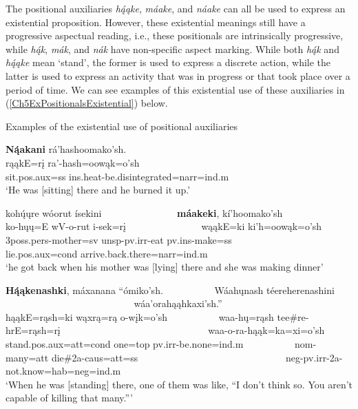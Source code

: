 The positional auxiliaries \textit{hą́ąke}, \textit{máake}, and \textit{náake} can all be used to express an existential proposition. However, these existential meanings still have a progressive aspectual reading, i.e., these positionals are intrinsically progressive, while \textit{hą́k}, \textit{mák}, and \textit{nák} have non-specific aspect marking. While both \textit{hą́k} and \textit{hą́ąke} mean `stand', the former is used to express a discrete action, while the latter is used to express an activity that was in progress or that took place over a period of time. We can see examples of this existential use of these auxiliaries in (\ref{Ch5ExPositionalsExistential}) below.

\begin{exe}
    \item\label{Ch5ExPositionalsExistential} Examples of the existential use of positional auxiliaries

    \begin{xlist}

    \item\label{Ch5ExPositionalsExistentialA} \glll \textbf{Ną́akani} rá'hashoomako'sh.\\
    rąąkE=rį ra'-hash=oowąk=o'sh\\
    \textnormal{sit}.pos.aux=ss ins.heat-\textnormal{be.disintegrated}=narr=ind.m\\
    \glt `He was [sitting] there and he burned it up.' \citep[182]{hollow1973b}

    \item\label{Ch5ExPositionalsExistentialB} \glll kohų́ųre wóorut ísekini ~ ~ ~ ~ ~ ~ ~ ~ ~ \textbf{máakeki}, kí'hoomako'sh\\
    ko-hųų=E wV-o-rut i-sek=rį ~ ~ ~ ~ ~ ~ ~ ~ ~ wąąkE=ki ki'h=oowąk=o'sh\\
    3poss.pers-\textnormal{mother}=sv unsp-pv.irr-\textnormal{eat} pv.ins-\textnormal{make}=ss ~ ~ ~ ~ ~ ~ ~ ~ ~ \textnormal{lie}.pos.aux=cond \textnormal{arrive.back.there}=narr=ind.m\\
    \glt `he got back when his mother was [lying] there and she was making dinner' \citep[67]{hollow1973a}

    \item\label{Ch5ExPositionalsExistentialC} \glll \textbf{Hą́ąkenashki}, máxanana ``ómiko'sh. ~ ~ ~ ~ ~ ~ Wáahųnash téereherenashini ~ ~ ~ ~ ~ ~ ~ ~ ~ ~ ~ ~ ~ ~ ~ ~ ~ ~ wáa'orahąąhkaxi'sh.''\\
    hąąkE=rąsh=ki wąxrą=rą o-wįk=o'sh ~ ~ ~ ~ ~ ~ waa-hų=rąsh tee\#re-hrE=rąsh=rį ~ ~ ~ ~ ~ ~ ~ ~ ~ ~ ~ ~ ~ ~ ~ ~ ~ ~ waa-o-ra-hąąk=ka=xi=o'sh\\
    \textnormal{stand}.pos.aux=att=cond \textnormal{one}=top pv.irr-\textnormal{be.none}=ind.m ~ ~ ~ ~ ~ ~ nom-\textnormal{many}=att \textnormal{die}\#2a-caus=att=ss ~ ~ ~ ~ ~ ~ ~ ~ ~ ~ ~ ~ ~ ~ ~ ~ ~ ~ neg-pv.irr-2a-\textnormal{not.know}=hab=neg=ind.m\\
    \glt `When he was [standing] there, one of them was like, ``I don't think so. You aren't capable of killing that many.{''}' \citep[7]{trechter2012b}

    \end{xlist}
\end{exe}

